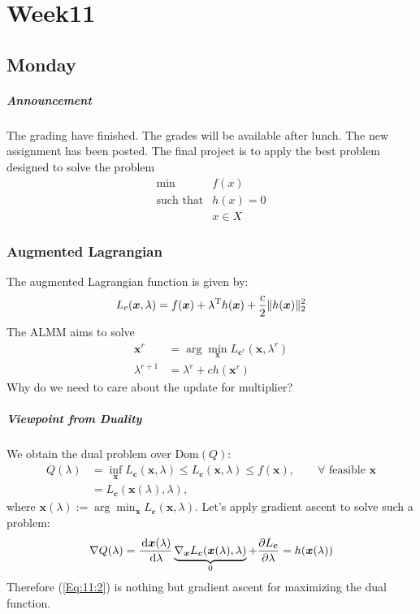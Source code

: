 
\chapter{Week11}

\section{Monday}
\paragraph{Announcement}
The grading have finished. The grades will be available after lunch. The new assignment has been posted. The final project is to apply the best problem designed to solve the problem
\[
\begin{array}{ll}
\min&f(x)\\
\mbox{such that}&h(x)=0\\
&x\in X
\end{array}
\]

\subsection{Augmented Lagrangian}
The augmented Lagrangian function is given by:
\[
L_c(\bm x,\lambda)=f(\bm x)+\lambda^{\mathrm T} h(\bm x)+\frac{c}{2}\|h(\bm x)\|_2^2
\]
The ALMM aims to solve
\begin{align}
\bm x^r&=\arg\min_{\bm x}L_{\bm c^r}(\bm x,\lambda^r)\\
\lambda^{r+1}&=\lambda^r+ch(\bm x^r)\label{Eq:11:2}
\end{align}
Why do we need to care about the update for multiplier? 

\paragraph{Viewpoint from Duality}
We obtain the dual problem over $\mbox{Dom}(Q)$:
\begin{align}
Q(\lambda)&=\inf_{\bm x}L_{\bm c}(\bm x,\lambda)\le L_{\bm c}(\bm x,\lambda)\le f(\bm x),\qquad\forall\mbox{ feasible }\bm x\\
&=L_{\bm c}(\bm x(\lambda),\lambda),
\end{align}
where $\bm x(\lambda):=\arg\min_{\bm x}L_{\bm c}(\bm x,\lambda)$. Let's apply gradient ascent to solve such a problem:
\[
\nabla Q(\lambda)=
\frac{\,\mathrm{d} \bm x(\lambda)}{\,\mathrm{d}\lambda}\underbrace{
\nabla_{\bm x}L_{\bm c}(\bm x(\lambda),\lambda)
}_{0}
+\frac{\partial L_{\bm c}}{\partial\lambda}=h(\bm x(\lambda))
\]
Therefore (\ref{Eq:11:2}) is nothing but gradient ascent for maximizing the dual function.

